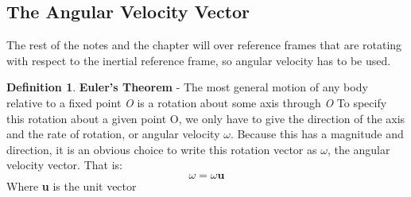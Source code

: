 \documentclass[11pt]{article}
\theoremstyle{definition}
\newtheorem{defn}{Definition}
\begin{document}
\subsection{The Angular Velocity Vector}
The rest of the notes and the chapter will over reference frames that are rotating with respect to the inertial reference frame, so angular velocity has to be used. 
\begin{defn}
\textbf{Euler's Theorem} - The most general motion of any body relative to a fixed point \textit{O} is a rotation about some axis through \textit{O} To specify this rotation about a given point O, we only have to give the direction of the axis and the rate of rotation, or angular velocity $\omega$. Because this has a magnitude and direction, it is an obvious choice to write this rotation vector as $\omega$, the angular velocity vector. That is:
\begin{equation}
\omega = \omega\textbf{u}
\end{equation}
Where \textbf{u} is the unit vector
\end{defn}
\end{document}
